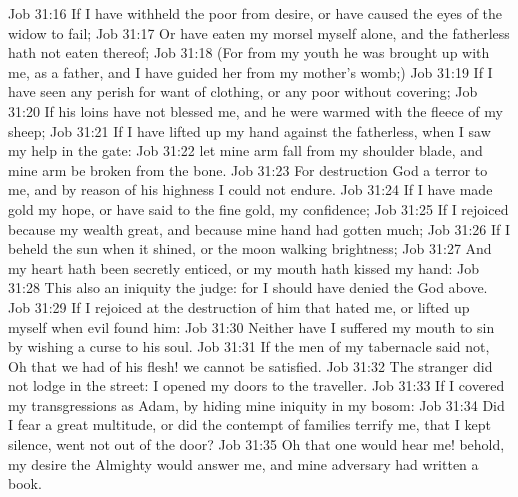 \vs Job 31:16 If I have withheld the poor from  desire, or have caused the eyes of the widow to fail;
\vs Job 31:17 Or have eaten my morsel myself alone, and the fatherless hath not eaten thereof;
\vs Job 31:18 (For from my youth he was brought up with me, as  a father, and I have guided her from my mother's womb;)
\vs Job 31:19 If I have seen any perish for want of clothing, or any poor without covering;
\vs Job 31:20 If his loins have not blessed me, and  he were  warmed with the fleece of my sheep;
\vs Job 31:21 If I have lifted up my hand against the fatherless, when I saw my help in the gate:
\vs Job 31:22  let mine arm fall from my shoulder blade, and mine arm be broken from the bone.
\vs Job 31:23 For destruction  God  a terror to me, and by reason of his highness I could not endure.
\vs Job 31:24 If I have made gold my hope, or have said to the fine gold,  my confidence;
\vs Job 31:25 If I rejoiced because my wealth  great, and because mine hand had gotten much;
\vs Job 31:26 If I beheld the sun when it shined, or the moon walking  brightness;
\vs Job 31:27 And my heart hath been secretly enticed, or my mouth hath kissed my hand:
\vs Job 31:28 This also  an iniquity  the judge: for I should have denied the God  above.
\vs Job 31:29 If I rejoiced at the destruction of him that hated me, or lifted up myself when evil found him:
\vs Job 31:30 Neither have I suffered my mouth to sin by wishing a curse to his soul.
\vs Job 31:31 If the men of my tabernacle said not, Oh that we had of his flesh! we cannot be satisfied.
\vs Job 31:32 The stranger did not lodge in the street:  I opened my doors to the traveller.
\vs Job 31:33 If I covered my transgressions as Adam, by hiding mine iniquity in my bosom:
\vs Job 31:34 Did I fear a great multitude, or did the contempt of families terrify me, that I kept silence,  went not out of the door?
\vs Job 31:35 Oh that one would hear me! behold, my desire  the Almighty would answer me, and  mine adversary had written a book.
